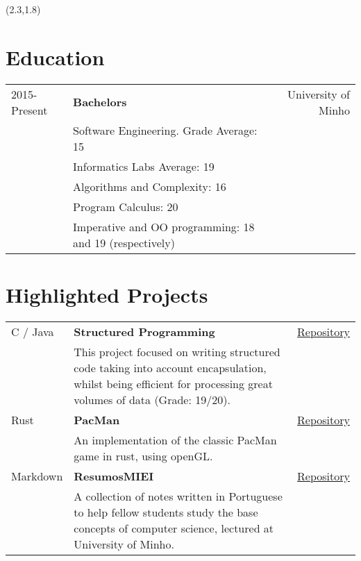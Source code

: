 \documentclass{article}
\begin{document}
\begin{textblock}{7.3} (2.3,1.8)

    \section{Education}
    \begin{tabular}{lp{8.4cm}r}
        2015-Present & \textbf{Bachelors} & University of Minho\\
        & Software Engineering. Grade Average: 15 &\\
        & Informatics Labs Average: 19 & \\
        & Algorithms and Complexity: 16 & \\
        & Program Calculus: 20 & \\
        & Imperative and OO programming: 18 and 19 (respectively) &\\
    \end{tabular}
    \section{Highlighted Projects}
    \begin{tabular}{lp{10.4cm}r}
        C / Java & \textbf{Structured Programming} & \href{https://github.com/Mendess2526/LI3_StructuredPrograming}{Repository}\\
        & This project focused on writing structured code taking into account
        encapsulation, whilst being efficient for processing great volumes of
        data (Grade: 19/20). &\\
        Rust & \textbf{PacMan} & \href{https://github.com/Mendess2526/rust-pacman}{Repository}\\
        & An implementation of the classic PacMan game in rust, using openGL. &\\
        Markdown & \textbf{ResumosMIEI} & \href{https://github.com/Mendess2526/ResumosMIEI}{Repository}\\
        & A collection of notes written in Portuguese to help fellow students
        study the base concepts of computer science, lectured at University of
        Minho. &\\
    \end{tabular}


\end{textblock}
\end{document}

